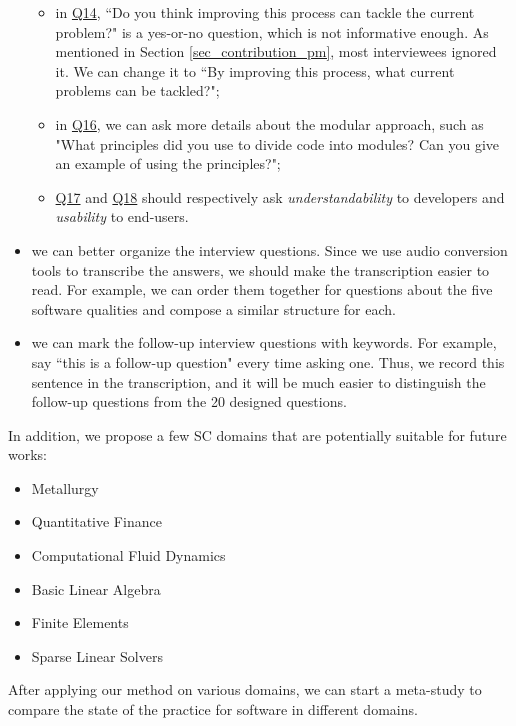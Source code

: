 \begin{itemize}
	\begin{itemize}
	    \item in \hyperlink{q14}{Q14}, ``Do you think improving this process can tackle the current problem?" is a yes-or-no question, which is not informative enough. As mentioned in Section \ref{sec_contribution_pm}, most interviewees ignored it. We can change it to ``By improving this process, what current problems can be tackled?";
	    \item in \hyperlink{q16}{Q16}, we can ask more details about the modular approach, such as "What principles did you use to divide code into modules? Can you give an example of using the principles?";
	    \item \hyperlink{q17}{Q17} and  \hyperlink{q18}{Q18} should respectively ask \textit{understandability} to developers and \textit{usability} to end-users.
	\end{itemize}
	\item we can better organize the interview questions. Since we use audio conversion tools to transcribe the answers, we should make the transcription easier to read. For example, we can order them together for questions about the five software qualities and compose a similar structure for each.
	\item we can mark the follow-up interview questions with keywords. For example, say ``this is a follow-up question" every time asking one. Thus, we record this sentence in the transcription, and it will be much easier to distinguish the follow-up questions from the 20 designed questions.
\end{itemize}

\noindent In addition, we propose a few SC domains that are potentially suitable for future works:
\begin{itemize}
    \item Metallurgy
    \item Quantitative Finance
    \item Computational Fluid Dynamics
    \item Basic Linear Algebra
    \item Finite Elements
    \item Sparse Linear Solvers
\end{itemize}

\noindent After applying our method on various domains, we can start a meta-study to compare the state of the practice for software in different domains.
